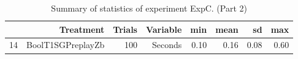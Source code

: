 \begin{table}[ht]
\centering
\begin{tabular}{rrrrrrrr}
  \hline
 & Treatment & Trials & Variable & min & mean & sd & max \\ 
  \hline
14 & BoolT1SGPreplayZb & 100 & Seconds & 0.10 & 0.16 & 0.08 & 0.60 \\ 
   \hline
\end{tabular}
\caption{Summary of statistics of experiment ExpC. (Part 2)} 
\end{table}
